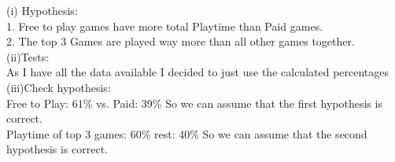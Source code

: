 \documentclass[11pt]{article}
\begin{document}
(i) Hypothesis:\\
1. Free to play games have more total Playtime than Paid games.\\
2. The top 3 Games are played way more than all other games together.\\
(ii)Tests:\\
As I have all the data available I decided to just use the calculated percentages\\
(iii)Check hypothesis:\\
Free to Play: 61\% vs. Paid: 39\% So we can assume that the first hypothesis is correct.\\
Playtime of top 3 games:  60\% rest: 40\% So we can assume that the second hypothesis is correct.\\
\end{document}
